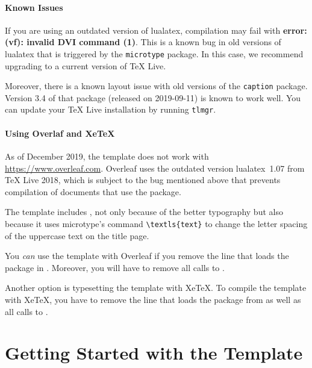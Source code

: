 \paragraph{Known Issues}

If you are using an outdated version of lualatex, compilation may fail with \textbf{error: (vf): invalid DVI command (1)}. This is a known bug in old versions of lualatex that is triggered by the \texttt{microtype} package. In this case, we recommend upgrading to a current version of TeX Live.

Moreover, there is a known layout issue with old versions of the \texttt{caption} package. Version 3.4 of that package (released on 2019-09-11) is known to work well. You can update your TeX Live installation by running \texttt{tlmgr}.

\paragraph{Using Overlaf and XeTeX}

As of December 2019, the template does not work with \url{https://www.overleaf.com}. Overleaf uses the outdated version lualatex~1.07 from TeX Live 2018, which is subject to the bug mentioned above that prevents compilation of documents that use the  package.

The template includes , not only because of the better typography but also because it uses microtype's command \verb|\textls{text}| to change the letter spacing of the uppercase text on the title page.

You \emph{can} use the template with Overleaf if you remove the line that loads the  package in . Moreover, you will have to remove all calls to .

Another option is typesetting the template with XeTeX. To compile the template with XeTeX, you have to remove the line that loads the package  from  as well as all calls to .


\section{Getting Started with the Template}

